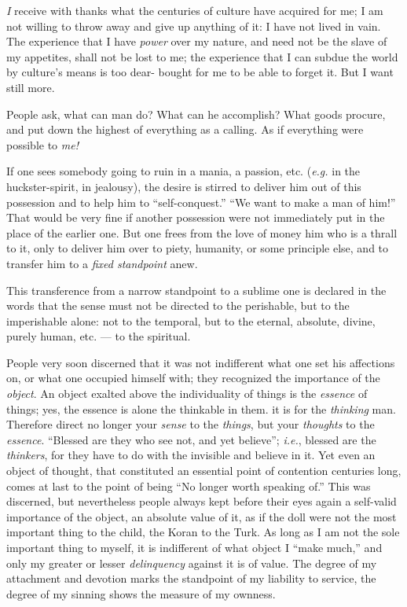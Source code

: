 \textit{I} receive with thanks what the centuries of culture have acquired for 
me; I am not willing to throw away and give up anything of it: I have not 
lived in vain. The experience that I have \textit{power} over my nature, and 
need not be the slave of my appetites, shall not be lost to me; the experience 
that I can subdue the world by culture's means is too dear- bought for me to 
be able to forget it. But I want still more.

People ask, what can man do? What can he accomplish? What goods procure, and 
put down the highest of everything as a calling. As if everything were 
possible to \textit{me!}

If one sees somebody going to ruin in a mania, a passion, etc. (\textit{e.g.} 
in the huckster-spirit, in jealousy), the desire is stirred to deliver him out 
of this possession and to help him to ``self-conquest.'' ``We want to make 
a man of him!'' That would be very fine if another possession were not 
immediately put in the place of the earlier one. But one frees from the love 
of money him who is a thrall to it, only to deliver him over to piety, 
humanity, or some principle else, and to transfer him to a \textit{fixed 
standpoint} anew.

This transference from a narrow standpoint to a sublime one is declared in the 
words that the sense must not be directed to the perishable, but to the 
imperishable alone: not to the temporal, but to the eternal, absolute, divine, 
purely human, etc. --- to the spiritual.

People very soon discerned that it was not indifferent what one set his 
affections on, or what one occupied himself with; they recognized the 
importance of the \textit{object}. An object exalted above the individuality 
of things is the \textit{essence} of things; yes, the essence is alone the 
thinkable in them. it is for the \textit{thinking} man. Therefore direct no 
longer your \textit{sense} to the \textit{things}, but your \textit{thoughts} 
to the \textit{essence}. ``Blessed are they who see not, and yet believe''; 
\textit{i.e.}, blessed are the \textit{thinkers}, for they have to do with 
the invisible and believe in it. Yet even an object of thought, that 
constituted an essential point of contention centuries long, comes at last to 
the point of being ``No longer worth speaking of.'' This was discerned, but 
nevertheless people always kept before their eyes again a self-valid 
importance of the object, an absolute value of it, as if the doll were not the 
most important thing to the child, the Koran to the Turk. As long as I am not 
the sole important thing to myself, it is indifferent of what object I ``make 
much,'' and only my greater or lesser \textit{delinquency} against it is of 
value. The degree of my attachment and devotion marks the standpoint of my 
liability to service, the degree of my sinning shows the measure of my 
ownness.

